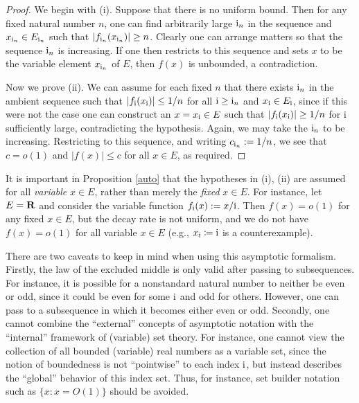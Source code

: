 \begin{proof} We begin with (i).  Suppose that there is no uniform bound.  Then for any fixed natural number $n$, one can find arbitrarily large ${\mathrm{i}}_n$ in the sequence and $x_{{\mathrm{i}}_n} \in E_{{\mathrm{i}}_n}$ such that $|f_{{\mathrm{i}}_n}(x_{{\mathrm{i}}_n})| \geq n$.  Clearly one can arrange matters so that the sequence ${\mathrm{i}}_n$ is increasing.  If one then restricts to this sequence and sets $x$ to be the variable element $x_{{\mathrm{i}}_n}$ of $E$, then $f(x)$ is unbounded, a contradiction.

Now we prove (ii).  We can assume for each fixed $n$ that there exists ${\mathrm{i}}_n$ in the ambient sequence such that $|f_{{\mathrm{i}}}(x_{{\mathrm{i}}})| \leq 1/n$ for all ${\mathrm{i}} \geq {\mathrm{i}}_n$ and $x_{{\mathrm{i}}} \in E_{{\mathrm{i}}}$, since if this were not the case one can construct an $x = x_{{\mathrm{i}}} \in E$ such that $|f_{{\mathrm{i}}}(x_{{\mathrm{i}}})| \geq 1/n$ for ${\mathrm{i}}$ sufficiently large, contradicting the hypothesis.  Again, we may take the ${\mathrm{i}}_n$ to be increasing.  Restricting to this sequence, and writing $c_{{\mathrm{i}}_n} := 1/n$, we see that $c=o(1)$ and $|f(x)| \leq c$ for all $x \in E$, as required.
\end{proof}

\begin{remark} It is important in Proposition \ref{auto} that the hypotheses in (i), (ii) are assumed for all \emph{variable} $x \in E$, rather than merely the \emph{fixed} $x \in E$.  For instance, let $E = \mathbf{R}$ and consider the variable function $f_{{\mathrm{i}}}(x) := x/{\mathrm{i}}$.  Then $f(x) = o(1)$ for any fixed $x \in E$, but the decay rate is not uniform, and we do not have $f(x) = o(1)$ for all variable $x \in E$ (e.g., $x_{\mathrm{i}} \coloneqq {\mathrm{i}}$ is a counterexample).
\end{remark}


\begin{remark} There are two caveats to keep in mind when using this asymptotic formalism.  Firstly, the law of the excluded middle is only valid after passing to subsequences.  For instance, it is possible for a nonstandard natural number to neither be even or odd, since it could be even for some ${\mathrm{i}}$ and odd for others.  However, one can pass to a subsequence in which it becomes either even or odd.  Secondly, one cannot combine the ``external'' concepts of asymptotic notation with the ``internal'' framework of (variable) set theory.  For instance, one cannot view the collection of all bounded (variable) real numbers as a variable set, since the notion of boundedness is not ``pointwise'' to each index ${\mathrm{i}}$, but instead describes the ``global'' behavior of this index set.  Thus, for instance, set builder notation such as $\{ x: x = O(1) \}$ should be avoided.
\end{remark}
